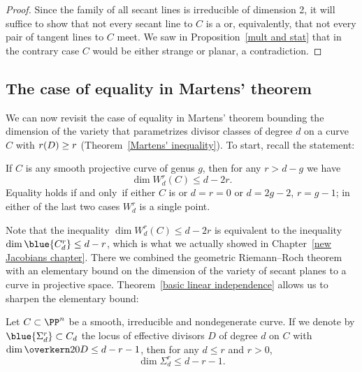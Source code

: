 \begin{proof}
Since the family of all secant lines is irreducible of dimension 2,  it
will suffice to show that not every secant line to $C$ is a 
%
or, equivalently, that not every pair of tangent lines to $C$
meet. We saw in Proposition~\ref{mult and stat} that in the contrary
case 
$C$ would be either strange or planar, a contradiction.
\end{proof}


\subsection*{The case of equality in Martens' theorem}

We can now revisit
the case
of equality in 
%
Martens' theorem
bounding the dimension of the variety
%
that parametrizes
divisor classes of degree $d$ on a curve $C$
with $r(D) \geq\nobreak r$
(Theorem~\ref{Martens' inequality}).
To start, recall the statement:

\begin{theorem}[Martens]\label{full Martens}
If $C$ is any smooth projective curve of genus $g$, then for any $r>d-g$
we have
$$
\dim W^r_d(C) \leq d-2r.
$$
Equality holds if and only~if either $C$ is 
%
or $d=r=0$ or $d=2g-2$, $r=g-1$; in either of the last two cases $W^r_d$ is
a single point.
\unif
\end{theorem}

Note that the inequality $\dim W^r_d(C) \leq d-2r$ is equivalent to the
%
inequality $\dim 
\blue{C^r_d}
\leq d-r$, which is what we actually showed
in Chapter~\ref{new Jacobians chapter}. There we combined
the geometric Riemann--Roch theorem
%
with an elementary bound on the
dimension of the variety of secant planes to a curve in projective space.
Theorem~\ref{basic linear independence} allows us to sharpen the elementary bound:

\begin{lemma}\label{Strong secant plane lemma}
Let $C \subset \PP^n$ be a smooth, irreducible and nondegenerate curve. If
%
we denote by $
\blue{\Sigma^r_d}
\subset C_d$ the locus of effective divisors
%
$D$ of degree $d$ on $C$ with $\dim \overkern20 D \leq d-r-1$, then for
any $d \leq r$ and $r > 0$,
$$
\dim \Sigma^r_d \leq d-r-1.
$$
\end{lemma}

